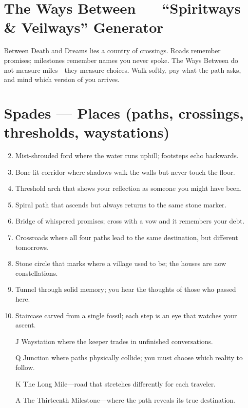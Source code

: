 \section{The Ways Between --- ``Spiritways \& Veilways'' Generator}
\label{chap:ways-between}

\noindent
Between Death and Dreams lies a country of crossings. Roads remember promises; milestones remember names you never spoke. The Ways Between do not measure miles---they measure choices. Walk softly, pay what the path asks, and mind which version of you arrives.

\section*{Spades --- Places (paths, crossings, thresholds, waystations)}
\label{sec:ways-between-places}
\begin{enumerate}
\setcounter{enumi}{1}
\item Mist-shrouded ford where the water runs uphill; footsteps echo backwards.
\item Bone-lit corridor where shadows walk the walls but never touch the floor.
\item Threshold arch that shows your reflection as someone you might have been.
\item Spiral path that ascends but always returns to the same stone marker.
\item Bridge of whispered promises; cross with a vow and it remembers your debt.
\item Crossroads where all four paths lead to the same destination, but different tomorrows.
\item Stone circle that marks where a village used to be; the houses are now constellations.
\item Tunnel through solid memory; you hear the thoughts of those who passed here.
\item Staircase carved from a single fossil; each step is an eye that watches your ascent.
\item[J] Waystation where the keeper trades in unfinished conversations.
\item[Q] Junction where paths physically collide; you must choose which reality to follow.
\item[K] The Long Mile---road that stretches differently for each traveler.
\item[A] The Thirteenth Milestone---where the path reveals its true destination.
\end{enumerate}


